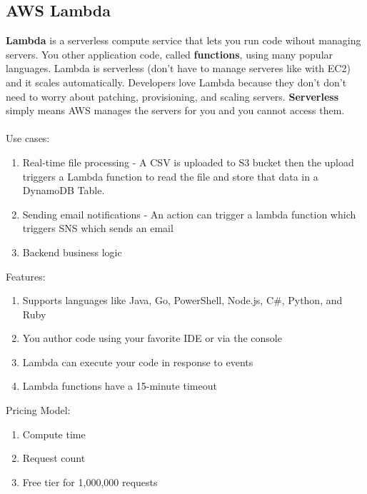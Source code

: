 \documentclass{article}%
\begin{document}
\subsection{AWS Lambda}
\textbf{Lambda} is a serverless compute service that lets you run code wihout managing servers. You other application code, called \textbf{functions}, using many popular languages.
Lambda is serverless (don't have to manage serveres like with EC2) and it scales automatically. Developers love Lambda because they don't don't need to worry about patching, provisioning, and
scaling servers. \textbf{Serverless} simply means AWS manages the servers for you and you cannot access them. \\ \\
Use cases:
\begin{enumerate}
    \item Real-time file processing - A CSV is uploaded to S3 bucket then the upload triggers a Lambda function to read the file and store that data in a DynamoDB Table.
    \item Sending email notifications - An action can trigger a lambda function which triggers SNS which sends an email
    \item Backend business logic
\end{enumerate}
Features:
\begin{enumerate}
    \item Supports languages like Java, Go, PowerShell, Node.js, C\#, Python, and Ruby
    \item You author code using your favorite IDE or via the console
    \item Lambda can execute your code in response to events 
    \item Lambda functions have a 15-minute timeout
\end{enumerate}
Pricing Model:
\begin{enumerate}
    \item Compute time
    \item Request count 
    \item Free tier for 1,000,000 requests
\end{enumerate}
\end{document}
